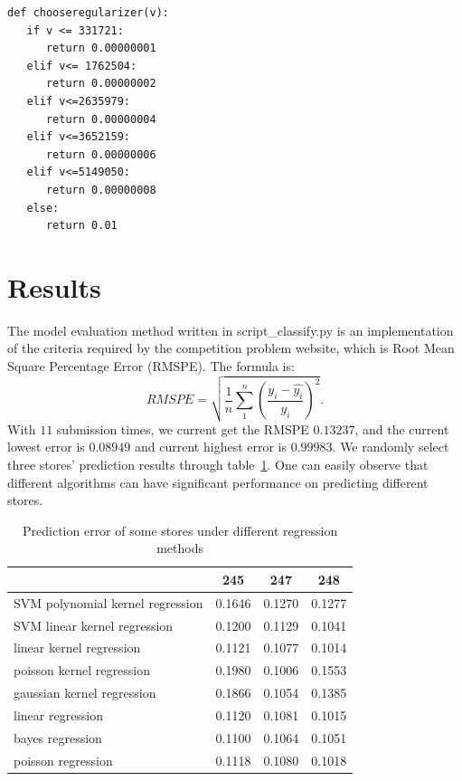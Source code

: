 \documentclass[11pt]{article}
\begin{document}
\begin{verbatim}
def chooseregularizer(v):
   if v <= 331721:
      return 0.00000001
   elif v<= 1762504:
      return 0.00000002
   elif v<=2635979:
      return 0.00000004
   elif v<=3652159:
      return 0.00000006
   elif v<=5149050:
      return 0.00000008
   else:
      return 0.01
\end{verbatim}%

\section{Results}

The model evaluation method written in script\_classify.py is an implementation of the criteria required by the competition problem website, which is Root Mean Square Percentage Error (RMSPE). The formula is: $$RMSPE = \sqrt{\frac{1}{n} \sum_{1}^{n} (\frac{y_i - \hat{y_i}}{y_i})^2}.$$ With $11$ submission times, we current get the RMSPE $0.13237$, and the current lowest error is $0.08949$ and current highest error is $0.99983$. We randomly select three stores' prediction results through table~\ref{table:table3}. One can easily observe that different algorithms can have significant performance on predicting different stores. 

\begin{table}
	\centering
	\label{table:table3}
	\begin{tabular}{|p{3.15cm}|c|c|c|}
		\hline
		\diagbox{Method}{Error}{Store Id} & 245 & 247 & 248 \\
		\hline
		SVM polynomial kernel regression & 0.1646 & 0.1270 & 0.1277 \\
		\hline
		SVM linear kernel regression & 0.1200 & 0.1129 & 0.1041 \\
		\hline
		linear kernel regression & 0.1121 & 0.1077 & 0.1014 \\
		\hline
		poisson kernel regression & 0.1980 & 0.1006 & 0.1553 \\
		\hline
		gaussian kernel regression & 0.1866 & 0.1054 & 0.1385 \\
		\hline
		linear regression & 0.1120 & 0.1081 & 0.1015 \\
		\hline
		bayes regression & 0.1100 & 0.1064 & 0.1051 \\
		\hline
		poisson regression & 0.1118 & 0.1080 & 0.1018 \\
		\hline
	\end{tabular}
	\caption{Prediction error of some stores under different regression methods}
\end{table}
\end{document}
